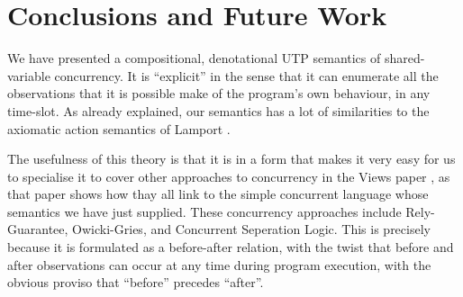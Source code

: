 \section{Conclusions and Future Work}\label{sec:conc}

We have presented a compositional, denotational UTP semantics
of shared-variable concurrency.
It is ``explicit'' in the sense that it can enumerate all the observations
that it is possible make of the program's own behaviour, in any time-slot.
As already explained, our semantics has a lot of similarities to the axiomatic action semantics of Lamport \cite{Lamport1985}.

The usefulness of this theory is that it is in a form that makes it very
easy for us to specialise it to cover
other approaches to concurrency in the Views paper \cite{conf/popl/Dinsdale-YoungBGPY13},
as that paper shows how thay all link to the simple concurrent language whose semantics we have just supplied.
These concurrency approaches include Rely-Guarantee\cite{DBLP:phd/ethos/Jones81,On-RG:vanStaden15},
Owicki-Gries\cite{DBLP:journals/acta/OwickiG76}, and
Concurrent Seperation Logic\cite{DBLP:journals/entcs/Brookes11}.
This is precisely because it is formulated as a before-after relation,
with the twist that before and after observations can occur at any time
during program execution, with the obvious proviso that
``before'' precedes ``after''.


